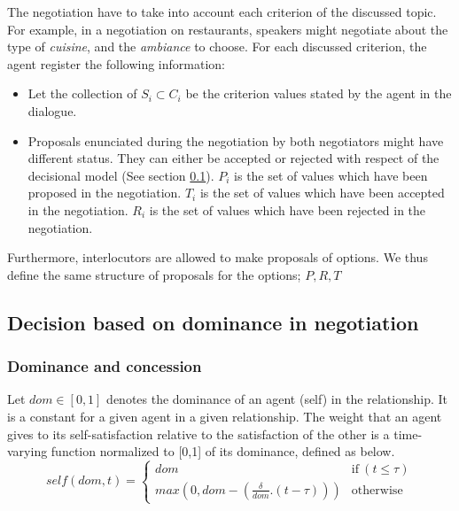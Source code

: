 \documentclass{llncs}
\begin{document}
	The negotiation have to take into account each criterion of the discussed topic. For example, in a negotiation on restaurants, speakers might negotiate about the type of \textit{cuisine}, and the \textit{ambiance} to choose.  
	For each discussed criterion, the agent register the following information:
	\begin{itemize} [noitemsep]
	\item Let the collection of $S_i \subset C_i$ be the criterion values stated by the agent in the dialogue.
	\item Proposals enunciated during the negotiation by both negotiators might have different status. They can either be accepted or rejected with respect of the decisional model (See section \ref{decision}).
	\subitem  $P_i$ is the set of  values which have been proposed in the negotiation.
	\subitem  $T_i$  is the set of values which have been accepted in the negotiation.
	\subitem  $R_i$  is the set of values which have been rejected in the negotiation.
	\end{itemize}
	
	Furthermore, interlocutors are allowed to make proposals of options. We thus define the same structure of proposals for the options; $P, R, T$
	
	\subsection{Decision based on dominance in negotiation}
	\label{decision}
	\subsubsection {Dominance and concession}
	Let  $dom \in [0, 1] $ denotes the dominance of an agent (self) in the relationship.  It is a constant for a given agent in a given relationship.
	The weight that an agent gives to its self-satisfaction relative to	the satisfaction of the other is a time-varying function normalized to 	[0,1] of its dominance, defined as below.
	\begin{equation}
	self(dom, t) = \left\{\begin{array}{ll}
	dom & \mathrm{if\ } (t \leq \tau)\\
	max(0, dom - (\frac{\delta}{dom} . (t - \tau))) & \mathrm{otherwise}
	\end{array}\right.
	\end{equation}
	
\end{document}
